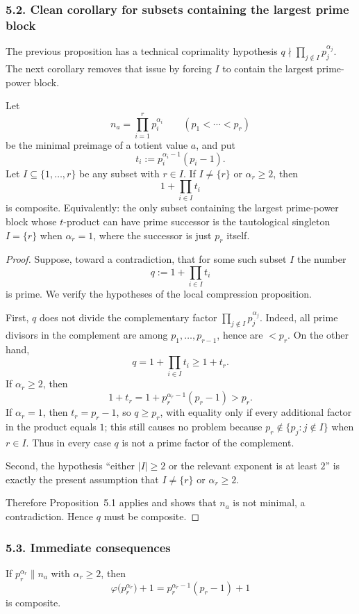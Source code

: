 \subsubsection*{5.2. Clean corollary for subsets containing the largest prime block}
The previous proposition has a technical coprimality hypothesis $q\nmid \prod_{j\notin I}p_j^{\alpha_j}$. The next corollary removes that issue by forcing $I$ to contain the largest prime-power block.

\begin{theorem}
Let
\[
 n_a=\prod_{i=1}^r p_i^{\alpha_i}
\qquad (p_1<\cdots <p_r)
\]
be the minimal preimage of a totient value $a$, and put
\[
 t_i:=p_i^{\alpha_i-1}(p_i-1).
\]
Let $I\subseteq\{1,\dots,r\}$ be any subset with $r\in I$.
If $I\neq \{r\}$ or $\alpha_r\ge 2$, then
\[
 1+\prod_{i\in I} t_i
\]
is composite.
Equivalently: the only subset containing the largest prime-power block whose $t$-product can have prime successor is the tautological singleton $I=\{r\}$ when $\alpha_r=1$, where the successor is just $p_r$ itself.
\end{theorem}

\begin{proof}
Suppose, toward a contradiction, that for some such subset $I$ the number
\[
 q:=1+\prod_{i\in I}t_i
\]
is prime.
We verify the hypotheses of the local compression proposition.

First, $q$ does not divide the complementary factor $\prod_{j\notin I}p_j^{\alpha_j}$. Indeed, all prime divisors in the complement are among $p_1,\dots,p_{r-1}$, hence are $<p_r$. On the other hand,
\[
 q=1+\prod_{i\in I} t_i \ge 1+t_r.
\]
If $\alpha_r\ge 2$, then
\[
 1+t_r=1+p_r^{\alpha_r-1}(p_r-1)>p_r.
\]
If $\alpha_r=1$, then $t_r=p_r-1$, so $q\ge p_r$, with equality only if every additional factor in the product equals $1$; this still causes no problem because $p_r\notin\{p_j:j\notin I\}$ when $r\in I$.
Thus in every case $q$ is not a prime factor of the complement.

Second, the hypothesis ``either $|I|\ge 2$ or the relevant exponent is at least $2$'' is exactly the present assumption that $I\neq \{r\}$ or $\alpha_r\ge 2$.

Therefore Proposition~5.1 applies and shows that $n_a$ is not minimal, a contradiction.
Hence $q$ must be composite.
\end{proof}

\subsubsection*{5.3. Immediate consequences}
\begin{corollary}
If $p_r^{\alpha_r}\parallel n_a$ with $\alpha_r\ge 2$, then
\[
 \varphi\!\bigl(p_r^{\alpha_r}\bigr)+1
 =p_r^{\alpha_r-1}(p_r-1)+1
\]
is composite.
\end{corollary}


